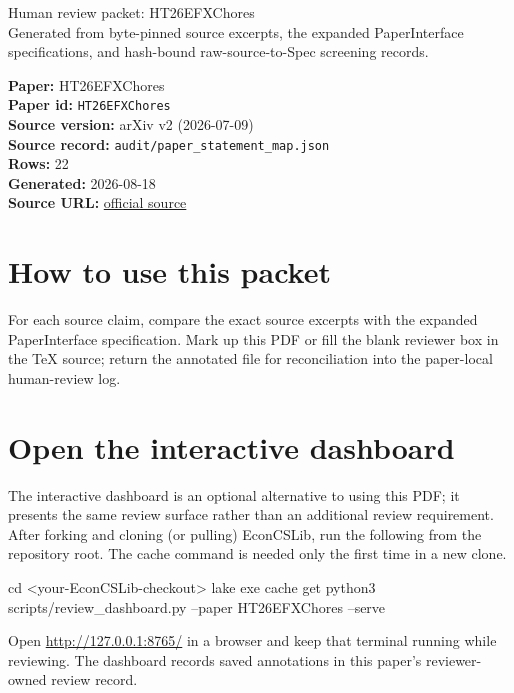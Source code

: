 \documentclass[10pt]{article}
\begin{document}
\fontsize{9}{10}\selectfont

\begin{center}
{\LARGE Human review packet: HT26EFXChores}\\[0.35em]
\small Generated from byte-pinned source excerpts, the expanded PaperInterface
specifications, and hash-bound raw-source-to-Spec screening records.
\end{center}

\noindent\textbf{Paper:} HT26EFXChores\\
\textbf{Paper id:} \texttt{HT26EFXChores}\\
\textbf{Source version:} arXiv v2 (2026-07-09)\\
\textbf{Source record:} \texttt{audit/paper\_statement\_map.json}\\
\textbf{Rows:} 22\\
\textbf{Generated:} 2026-08-18\\
\textbf{Source URL:} \href{https://arxiv.org/abs/2606.08872v2}{official source}





\section*{How to use this packet}
For each source claim, compare the exact source excerpts with the expanded
PaperInterface specification. Mark up this PDF or fill the blank reviewer box in the TeX source;
return the annotated file for reconciliation into the paper-local human-review
log.

\section*{Open the interactive dashboard}
The interactive dashboard is an optional alternative to using this PDF; it
presents the same review surface rather than an additional review requirement.
After forking and cloning (or pulling) EconCSLib, run the following from the
repository root. The cache command is needed only the first time in a new clone.
\begin{ReviewVerbatim}
cd <your-EconCSLib-checkout>
lake exe cache get
python3 scripts/review_dashboard.py --paper HT26EFXChores --serve
\end{ReviewVerbatim}
Open \url{http://127.0.0.1:8765/} in a browser and keep that terminal running
while reviewing. The dashboard records saved annotations in this paper's
reviewer-owned review record.
\end{document}

